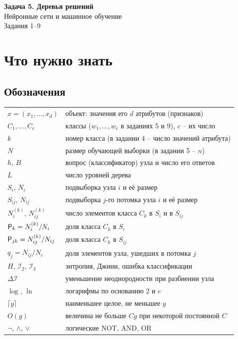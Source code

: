 \documentclass[12pt,a4paper]{article}
\begin{document}
\begin{center}
  {\large\bfseries Задача 5. Деревья решений}\\[1mm]
  Нейронные сети и машинное обучение\\[1mm]
  Задания 1--9
\end{center}

\section{Что нужно знать}

\subsection{Обозначения}

\begin{center}
\begin{tabular}{lp{}}
\toprule
$x = (x_1, \dots, x_d)$ & объект: значения его $d$ атрибутов (признаков) \\
$C_1, \dots, C_c$ & классы ($w_1, \dots, w_c$ в заданиях 5 и 9), $c$ -- их число \\
$k$ & номер класса (в задании 4 -- число значений атрибута) \\
$N$ & размер обучающей выборки (в задании 5 -- $n$) \\
$h$, $B$ & вопрос (классификатор) узла и число его ответов \\
$L$ & число уровней дерева \\
$S_i$, $N_i$ & подвыборка узла $i$ и её размер \\
$S_{ij}$, $N_{ij}$ & подвыборка $j$-го потомка узла $i$ и её размер \\
$N_i^{(k)}$, $N_{ij}^{(k)}$ & число элементов класса $C_k$ в $S_i$ и в $S_{ij}$ \\
$\mathsf{P}_k = N_i^{(k)}/N_i$ & доля класса $C_k$ в $S_i$ \\
$\mathsf{P}_{jk} = N_{ij}^{(k)}/N_{ij}$ & доля класса $C_k$ в $S_{ij}$ \\
$q_j = N_{ij}/N_i$ & доля элементов узла, ушедших в потомка $j$ \\
$H$, $\mathcal{I}_2$, $\mathcal{I}_3$ & энтропия, Джини, ошибка классификации \\
$\Delta\mathcal{I}$ & уменьшение неоднородности при разбиении узла \\
$\log$, $\ln$ & логарифмы по основанию 2 и $e$ \\
$\lceil y\rceil$ & наименьшее целое, не меньшее $y$ \\
$O(g)$ & величина не больше $Cg$ при некоторой постоянной $C$ \\
$\neg$, $\wedge$, $\vee$ & логические NOT, AND, OR \\
\bottomrule
\end{tabular}
\end{center}
\end{document}
